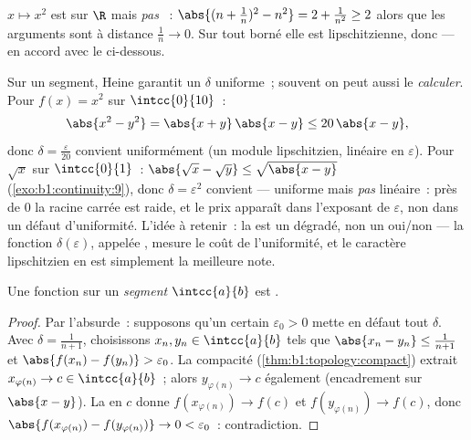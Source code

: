 \begin{example}\label{ex:b1:continuity:notuniform}
$x \mapsto x^2$ est  sur $\R$ mais \emph{pas} ~: $\abs{(n + \frac 1n)^2 - n^2} = 2 + \frac{1}{n^2} \geq 2$
alors que les arguments sont à distance $\frac 1n \to 0$. Sur tout
 borné elle est lipschitzienne, donc 
--- en accord avec le  ci-dessous.
\end{example}

\begin{example}\label{ex:b1:continuity:moduli}
Sur un segment, Heine garantit un $\delta$ uniforme~; souvent on
peut aussi le \emph{calculer}. Pour $f(x) = x^2$ sur
$\intcc{0}{10}$~:
\[
\abs{x^2 - y^2} = \abs{x + y}\,\abs{x - y} \leq 20\,\abs{x - y},
\]
donc $\delta = \frac{\varepsilon}{20}$ convient uniformément (un
module lipschitzien, linéaire en $\varepsilon$). Pour $\sqrt x$
sur $\intcc{0}{1}$~: $\abs{\sqrt x - \sqrt y} \leq \sqrt{\abs{x -
y}}$ (\cref{exo:b1:continuity:9}), donc $\delta = \varepsilon^2$
convient --- uniforme mais \emph{pas} linéaire~: près de $0$ la
racine carrée est raide, et le prix apparaît dans l'exposant de
$\varepsilon$, non dans un défaut d'uniformité. L'idée à
retenir~: la  est un dégradé, non un oui/non
--- la fonction $\delta(\varepsilon)$, appelée , mesure le
coût de l'uniformité, et le caractère lipschitzien en est
simplement la meilleure note.
\end{example}

\begin{theorem}[Heine]\label{thm:b1:continuity:heine}
Une fonction  sur un \emph{segment} $\intcc{a}{b}$ est
.
\end{theorem}

\begin{proof}
Par l'absurde~: supposons qu'un certain $\varepsilon_0 > 0$ mette en
défaut tout $\delta$. Avec $\delta = \frac{1}{n+1}$, choisissons
$x_n, y_n \in \intcc{a}{b}$ tels que $\abs{x_n - y_n} \leq
\frac{1}{n+1}$ et $\abs{f(x_n) - f(y_n)} > \varepsilon_0$. La
compacité (\cref{thm:b1:topology:compact}) extrait $x_{\varphi(n)} \to
c \in \intcc{a}{b}$~; alors $y_{\varphi(n)} \to c$ également
(encadrement sur $\abs{x - y}$). La  en $c$ donne
$f(x_{\varphi(n)}) \to f(c)$ et $f(y_{\varphi(n)}) \to f(c)$, donc
$\abs{f(x_{\varphi(n)}) - f(y_{\varphi(n)})} \to 0 < \varepsilon_0$~:
contradiction.
\end{proof}


